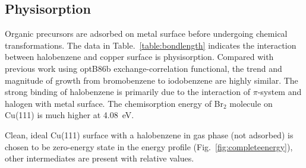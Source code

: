 \documentclass[%
 reprint,
 amsmath,amssymb,
 aps,
prb,
floatfix,
]{revtex4-2}
\newcommand{\lock}{\color{red}}
\newcommand{\zhzh}{\color{blue}}
\newcommand{\lock}{\color{black}}
\newcommand{\zhzh}{\color{black}}
\newcommand{\comm}{\color{Purple}} %
\begin{document}
\subsection{Physisorption}

{\zhzh
Organic precursors are adsorbed on metal surface before undergoing chemical transformations. 
The data in Table.~\ref{table:bondlength} indicates the interaction between halobenzene and copper surface is physisorption. Compared with previous work using optB86b exchange-correlation functional, the trend and magnitude of growth from bromobenzene to iodobenzene are highly similar. The strong binding of halobenzene is primarily due to the interaction of $\pi$-system and halogen with metal surface. The chemisorption energy of Br$_2$ molecule on Cu(111) is much higher at \SI{4.08}{\electronvolt}.




}

{\comm Clean, ideal Cu(111) surface with a halobenzene in gas phase (not adsorbed) is chosen to be zero-energy state in the energy profile (Fig.~\ref{fig:completeenergy}), other intermediates are present with relative values.}
\end{document}
